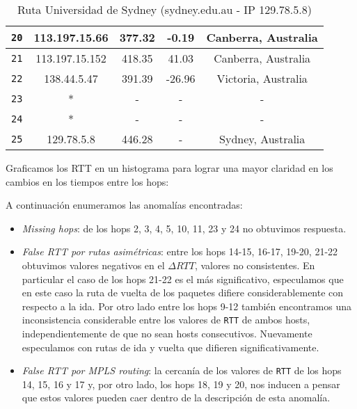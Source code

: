 \begin{table}[ht]
\begin{center}
\begin{tabular}{|c|c|c|c|c|}
    \texttt{20} & 113.197.15.66   & 377.32  & -0.19   & Canberra, Australia   \\ \hline
    \texttt{21} & 113.197.15.152  & 418.35  & 41.03   & Canberra, Australia    \\ \hline
    \texttt{22} & 138.44.5.47     & 391.39  & -26.96  & Victoria, Australia   \\ \hline
    \texttt{23} & *               & -       & -       & -                \\ \hline
    \texttt{24} & *               & -       & -       & -   \\ \hline
    \texttt{25} & 129.78.5.8      & 446.28  & -       & Sydney, Australia   \\ \hline
    \end{tabular}
    \caption{Ruta Universidad de Sydney (sydney.edu.au - IP 129.78.5.8)}
\end{center}\end{table}

Graficamos los RTT en un histograma para lograr una mayor claridad en los cambios en los tiempos entre los hops:

\begin{figure}[H]
    \centering
\end{figure}

A continuación enumeramos las anomalías encontradas:
\begin{itemize}
    \item \textit{Missing hops}: de los hops 2, 3, 4, 5, 10, 11, 23 y 24 no obtuvimos respuesta.
    \item \textit{False RTT por rutas asimétricas}: entre los hops 14-15, 16-17, 19-20, 21-22 obtuvimos valores negativos en el $\Delta RTT$, valores no consistentes. En particular el caso de los hops 21-22 es el más significativo, especulamos que en este caso la ruta de vuelta de los paquetes difiere considerablemente con respecto a la ida. Por otro lado entre los hops 9-12 también encontramos una inconsistencia considerable entre los valores de \texttt{RTT} de ambos hosts, independientemente de que no sean hosts consecutivos. Nuevamente especulamos con rutas de ida y vuelta que difieren significativamente.
    \item \textit{False RTT por MPLS routing}: la cercanía de los valores de \texttt{RTT} de los hops 14, 15, 16 y 17 y, por otro lado, los hops 18, 19 y 20, nos inducen a pensar que estos valores pueden caer dentro de la descripción de esta anomalía.
\end{itemize}

